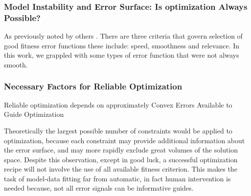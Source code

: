 

   \subsubsection{Model Instability and Error Surface: Is optimization Always Possible?} 


As previously noted by others \cite{van2007neurofitter}. There are three criteria that govern selection of good fitness error functions these include: speed, smoothness and relevance. In this work, we grappled with some types of error function that were not always smooth. 


\subsubsection{Necessary Factors for Reliable Optimization}
Reliable optimization depends on approximately Convex Errors Available to Guide Optimization

Theoretically the largest possible number of constraints would be applied to optimization, because each constraint may provide additional information about the error surface, and may more rapidly exclude great volumes of the solution space. Despite this observation, except in good luck, a successful optimization recipe will not involve the use of all available fitness criterion. This makes the task of model-data fitting far from automatic, in fact human intervention is needed because, not all error signals can be informative guides. 

    
    
